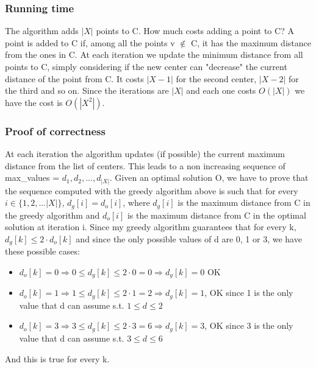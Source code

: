 \subsubsection{Running time}
The algorithm adds $|X|$ points to C. How much costs adding a point to C? A point is added to C if, among all the points v $\notin$ C, it has the maximum distance from the ones in C. At each iteration we update the minimum distance from all points to C, simply considering if the new center can "decrease" the current distance of the point from C. It costs $|X - 1|$ for the second center, $|X - 2|$ for the third and so on. Since the iterations are $|X|$ and each one costs $O(|X|)$ we have the cost is $O(|X^2|)$.
\subsubsection{Proof of correctness}
At each iteration the algorithm updates (if possible) the current maximum distance from the list of centers. This leads to a non increasing sequence of max\_values = ${d_1, d_2, ..., d_{|X|}}$. Given an optimal solution O, we have to prove that the sequence computed with the greedy algorithm above is such that for every $i \in \{1, 2, ... |X|\}$, $d_g[i] = d_o[i] $, where $d_g[i]$ is the maximum distance from C in the greedy algorithm and $d_o[i]$ is the maximum distance from C in the optimal solution at iteration i. Since my greedy algorithm guarantees \cite{K-center} that for every k, $d_g[k] \leq 2 \cdot d_o[k]$ and since the only possible values of d are 0, 1 or 3, we have these possible cases:
\begin{itemize}
	\item $d_o[k] = 0 \Rightarrow  0 \leq d_g[k] \leq 2\cdot0 = 0 \Rightarrow d_g[k] = 0$ OK
	\item $d_o[k] = 1 \Rightarrow  1 \leq d_g[k] \leq 2\cdot1 = 2 \Rightarrow d_g[k] = 1 $, OK since 1 is the only value that d can assume s.t. $1 \leq d \leq 2$
	\item $d_o[k] = 3 \Rightarrow  3 \leq d_g[k] \leq 2\cdot3 = 6 \Rightarrow d_g[k] = 3 $, OK since 3 is the only value that d can assume s.t. $3 \leq d \leq 6$
\end{itemize}
And this is true for every k.